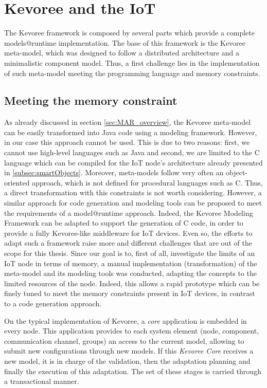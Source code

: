 \section{Kevoree and the IoT}
\label{sec:kevAndIoT}
The Kevoree framework is composed by several parts which provide a complete models@runtime implementation.
The base of this framework is the Kevoree meta-model, which was designed to follow a distributed architecture and a minimalistic component model.
Thus, a first challenge lies in the implementation of such meta-model meeting the programming language and memory constraints.

\subsection{Meeting the memory constraint}
As already discussed in section \ref{sec:MAR_overview}, the Kevoree meta-model can be easily transformed into Java code using a modeling framework.
However, in our case this approach cannot be used.
This is due to two reasons: first, we cannot use high-level languages such as Java and second, we are limited to the C language which can be compiled for the IoT node's architecture already presented in \ref{subsec:smartObjects}.
Moreover, meta-models follow very often an object-oriented approach, which is not defined for procedural languages such as C.
Thus, a direct transformation with this constraints is not worth considering.
However, a similar approach for code generation and modeling tools can be proposed to meet the requirements of a model@runtime approach.
Indeed, the Kevoree Modeling Framework\cite{fouquet2012eclipse} can be adapted to support the generation of C code, in order to provide a fully Kevoree-like middleware for IoT devices.
Even so, the efforts to adapt such a framework raise more and different challenges that are out of the scope for this thesis.
Since our goal is to, first of all, investigate the limits of an IoT node in terms of memory, a manual implementation (transformation) of the meta-model and its modeling tools was conducted, adapting the concepts to the limited resources of the node.
Indeed, this allows a rapid prototype which can be finely tuned to meet the memory constraints present in IoT devices, in contrast to a code generation approach.

On the typical implementation of Kevoree, a \textit{core} application is embedded in every node. 
This application provides to each system element (node, component, communication channel, groups) an access to the current model, allowing to submit new configurations through new models.
If this \textit{Kevoree Core} receives a new model, it is in charge of the validation, then the adaptation planning and finally the execution of this adaptation.
The set of these stages is carried through a transactional manner.

